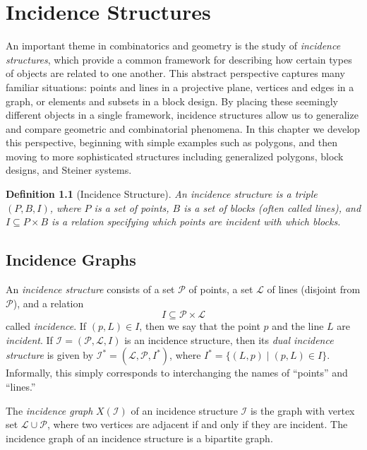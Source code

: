 \documentclass[12pt,a4paper,openany]{book}
\newtheorem{definition}{Definition}[section]
\begin{document}
\chapter{Incidence Structures}\label{chap:incidence}

An important theme in combinatorics and geometry is the study of 
\emph{incidence structures}, which provide a common framework for 
describing how certain types of objects are related to one another. 
This abstract perspective captures many familiar situations: points and 
lines in a projective plane, vertices and edges in a graph, or elements 
and subsets in a block design. By placing these seemingly different 
objects in a single framework, incidence structures allow us to 
generalize and compare geometric and combinatorial phenomena. 
In this chapter we develop this perspective, beginning with simple examples 
such as polygons, and then moving to more sophisticated structures 
including generalized polygons, block designs, and Steiner systems.

\begin{definition}[Incidence Structure]\label{def:incidence-structure}
An \emph{incidence structure} is a triple $(P, B, I)$, where $P$ is a set 
of \emph{points}, $B$ is a set of \emph{blocks} (often called lines), 
and $I \subseteq P \times B$ is a relation specifying which points are 
\emph{incident} with which blocks.
\end{definition}

\section*{Incidence Graphs}

An \emph{incidence structure} consists of a set $\mathcal{P}$ of points, a set $\mathcal{L}$ of lines (disjoint from $\mathcal{P}$), and a relation
\[
I \subseteq \mathcal{P} \times \mathcal{L}
\]
called \emph{incidence}. If $(p, L) \in I$, then we say that the point $p$ and the line $L$ are \emph{incident}. If $\mathcal{I} = (\mathcal{P}, \mathcal{L}, I)$ is an incidence structure, then its \emph{dual incidence structure} is given by $\mathcal{I}^* = (\mathcal{L}, \mathcal{P}, I^*)$, where $I^* = \{(L,p) \mid (p, L) \in I\}$. Informally, this simply corresponds to interchanging the names of ``points'' and ``lines.''

The \emph{incidence graph} $X(\mathcal{I})$ of an incidence structure $\mathcal{I}$ is the graph with vertex set $\mathcal{L} \cup \mathcal{P}$, where two vertices are adjacent if and only if they are incident. The incidence graph of an incidence structure is a bipartite graph.
\end{document}

